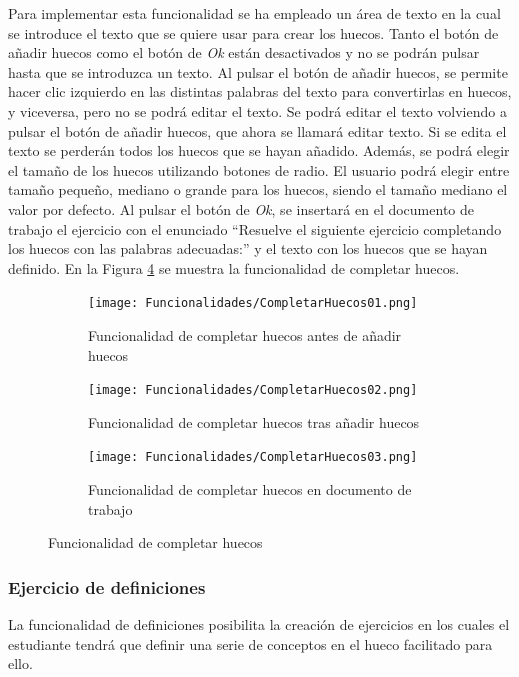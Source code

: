 Para implementar esta funcionalidad se ha empleado un área de texto en la cual se introduce el texto que se quiere usar para crear los huecos. Tanto el botón de añadir huecos como el botón de \textit{Ok} están desactivados y no se podrán pulsar hasta que se introduzca un texto. Al pulsar el botón de añadir huecos, se permite hacer clic izquierdo en las distintas palabras del texto para convertirlas en huecos, y viceversa, pero no se podrá editar el texto. Se podrá editar el texto volviendo a pulsar el botón de añadir huecos, que ahora se llamará editar texto. Si se edita el texto se perderán todos los huecos que se hayan añadido. Además, se podrá elegir el tamaño de los huecos utilizando botones de radio. El usuario podrá elegir entre tamaño pequeño, mediano o grande para los huecos, siendo el tamaño mediano el valor por defecto. Al pulsar el botón de \textit{Ok}, se insertará en el documento de trabajo el ejercicio con el enunciado ``Resuelve el siguiente ejercicio completando los huecos con las palabras adecuadas:'' y el texto con los huecos que se hayan definido. En la Figura \ref{fig:impcompletarhuecos} se muestra la funcionalidad de completar huecos.

\begin{figure}[ht!]
  \centering
  \begin{subfigure}{\textwidth}
    \centering
    \texttt{[image: Funcionalidades/CompletarHuecos01.png]}
    \caption{Funcionalidad de completar huecos antes de añadir huecos}
    \label{fig:impcompletarhuecos01}
  \end{subfigure}

  \begin{subfigure}{\textwidth}
    \centering
    \texttt{[image: Funcionalidades/CompletarHuecos02.png]}
    \caption{Funcionalidad de completar huecos tras añadir huecos}
    \label{fig:impcompletarhuecos02}
  \end{subfigure}

  \begin{subfigure}{\textwidth}
    \centering
    \texttt{[image: Funcionalidades/CompletarHuecos03.png]}
    \caption{Funcionalidad de completar huecos en documento de trabajo}
    \label{fig:impcompletarhuecos03}
  \end{subfigure}

  \caption{Funcionalidad de completar huecos}
  \label{fig:impcompletarhuecos}
\end{figure}

\subsubsection{Ejercicio de definiciones}
\label{sec:ejercicioDefiniciones}
La funcionalidad de definiciones posibilita la creación de ejercicios en los cuales el estudiante tendrá que definir una serie de conceptos en el hueco facilitado para ello.

